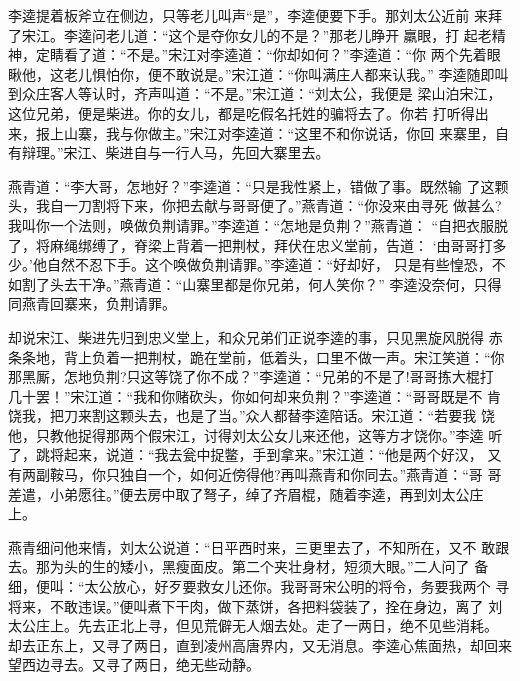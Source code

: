 李逵提着板斧立在侧边，只等老儿叫声“是”，李逵便要下手。那刘太公近前
来拜了宋江。李逵问老儿道：“这个是夺你女儿的不是？”那老儿睁开羸眼，打
起老精神，定睛看了道：“不是。”宋江对李逵道：“你却如何？”李逵道：“你
两个先着眼瞅他，这老儿惧怕你，便不敢说是。”宋江道：“你叫满庄人都来认我。”
李逵随即叫到众庄客人等认时，齐声叫道：“不是。”宋江道：“刘太公，我便是
梁山泊宋江，这位兄弟，便是柴进。你的女儿，都是吃假名托姓的骗将去了。你若
打听得出来，报上山寨，我与你做主。”宋江对李逵道：“这里不和你说话，你回
来寨里，自有辩理。”宋江、柴进自与一行人马，先回大寨里去。

燕青道：“李大哥，怎地好？”李逵道：“只是我性紧上，错做了事。既然输
了这颗头，我自一刀割将下来，你把去献与哥哥便了。”燕青道：“你没来由寻死
做甚么?我叫你一个法则，唤做负荆请罪。”李逵道：“怎地是负荆？”燕青道：
“自把衣服脱了，将麻绳绑缚了，脊梁上背着一把荆杖，拜伏在忠义堂前，告道：
‘由哥哥打多少。’他自然不忍下手。这个唤做负荆请罪。”李逵道：“好却好，
只是有些惶恐，不如割了头去干净。”燕青道：“山寨里都是你兄弟，何人笑你？”
李逵没奈何，只得同燕青回寨来，负荆请罪。

却说宋江、柴进先归到忠义堂上，和众兄弟们正说李逵的事，只见黑旋风脱得
赤条条地，背上负着一把荆杖，跪在堂前，低着头，口里不做一声。宋江笑道：“你
那黑厮，怎地负荆?只这等饶了你不成？”李逵道：“兄弟的不是了!哥哥拣大棍打
几十罢！”宋江道：“我和你赌砍头，你如何却来负荆？”李逵道：“哥哥既是不
肯饶我，把刀来割这颗头去，也是了当。”众人都替李逵陪话。宋江道：“若要我
饶他，只教他捉得那两个假宋江，讨得刘太公女儿来还他，这等方才饶你。”李逵
听了，跳将起来，说道：“我去瓮中捉鳖，手到拿来。”宋江道：“他是两个好汉，
又有两副鞍马，你只独自一个，如何近傍得他?再叫燕青和你同去。”燕青道：“哥
哥差遣，小弟愿往。”便去房中取了弩子，绰了齐眉棍，随着李逵，再到刘太公庄
上。

燕青细问他来情，刘太公说道：“日平西时来，三更里去了，不知所在，又不
敢跟去。那为头的生的矮小，黑瘦面皮。第二个夹壮身材，短须大眼。”二人问了
备细，便叫：“太公放心，好歹要救女儿还你。我哥哥宋公明的将令，务要我两个
寻将来，不敢违误。”便叫煮下干肉，做下蒸饼，各把料袋装了，拴在身边，离了
刘太公庄上。先去正北上寻，但见荒僻无人烟去处。走了一两日，绝不见些消耗。
却去正东上，又寻了两日，直到凌州高唐界内，又无消息。李逵心焦面热，却回来
望西边寻去。又寻了两日，绝无些动静。

